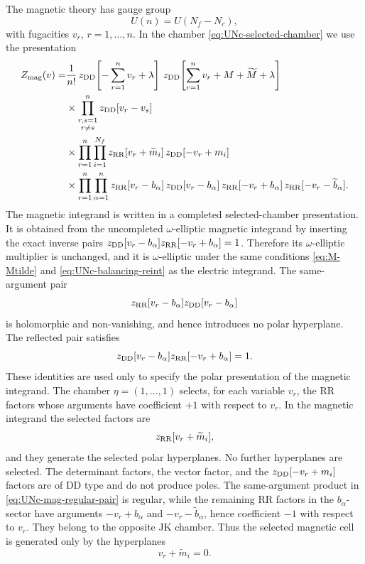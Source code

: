 \documentclass[11pt,a4paper]{article}
\numberwithin{equation}{section}
\theoremstyle{plain}
\theoremstyle{definition}
\theoremstyle{remark}
\begin{document}
The magnetic theory has gauge group
\begin{equation}
U(n)=U(N_f-N_c),
\end{equation}
with fugacities \(v_r\), \(r=1,\ldots,n\).  In the chamber \eqref{eq:UNc-selected-chamber} we use the presentation
\begin{equation}
\begin{aligned}
Z_{\rm mag}(v)
=&\frac{1}{n!}\,
z_{\rm DD}\!\left[-\sum_{r=1}^{n}v_r+\lambda\right]\,
z_{\rm DD}\!\left[\sum_{r=1}^{n}v_r+M+\widetilde M+\lambda\right]
\\
&\times
\prod_{\substack{r,s=1\\ r\neq s}}^{n}
z_{\rm DD}[v_r-v_s]
\\
&\times
\prod_{r=1}^{n}\prod_{i=1}^{N_f}
z_{\rm RR}[v_r+\widetilde m_i]\,
z_{\rm DD}[-v_r+m_i]
\\
&\times
\prod_{r=1}^{n}\prod_{\alpha=1}^{n}
z_{\rm RR}[v_r-b_\alpha]\,
z_{\rm DD}[v_r-b_\alpha]\,
z_{\rm RR}[-v_r+b_\alpha]\,
z_{\rm RR}[-v_r-\widetilde b_\alpha] .
\end{aligned}
\label{eq:Zmag-UNc-reint-completed}
\end{equation}
The magnetic integrand is written in a completed selected-chamber presentation.  It is obtained from the uncompleted \(\omega\)-elliptic magnetic integrand by inserting the exact inverse pairs \(z_{\rm DD}[v_r-b_\alpha]z_{\rm RR}[-v_r+b_\alpha]=1\).  Therefore its \(\omega\)-elliptic multiplier is unchanged, and it is \(\omega\)-elliptic under the same conditions \eqref{eq:M-Mtilde} and \eqref{eq:UNc-balancing-reint} as the electric integrand.
The same-argument pair
\begin{equation}
z_{\rm RR}[v_r-b_\alpha] z_{\rm DD}[v_r-b_\alpha]
\label{eq:UNc-mag-regular-pair}
\end{equation}
is holomorphic and non-vanishing, and hence introduces no polar hyperplane.  The reflected pair satisfies
\begin{equation}
z_{\rm DD}[v_r-b_\alpha]z_{\rm RR}[-v_r+b_\alpha]=1 .
\label{eq:UNc-reint-identity-pair}
\end{equation}
These identities are used only to specify the polar presentation of the magnetic integrand.
The chamber \(\eta=(1,\ldots,1)\) selects, for each variable \(v_r\), the RR factors whose arguments have coefficient \(+1\) with respect to \(v_r\).  In the magnetic integrand the selected factors are
\begin{equation}
z_{\rm RR}[v_r+\widetilde m_i] ,
\label{eq:UNc-mag-selected-hyperplanes}
\end{equation}
and they generate the selected polar hyperplanes.  No further hyperplanes are selected.  The determinant factors, the vector factor, and the \(z_{\rm DD}[-v_r+m_i]\) factors are of DD type and do not produce poles.  The same-argument product in \eqref{eq:UNc-mag-regular-pair} is regular, while the remaining RR factors in the \(b_\alpha\)-sector have arguments \(-v_r+b_\alpha\) and \(-v_r-\widetilde b_\alpha\), hence coefficient \(-1\) with respect to \(v_r\).  They belong to the opposite JK chamber.  Thus the selected magnetic cell is generated only by the hyperplanes
\begin{equation}
v_r+\widetilde m_i=0 .
\end{equation}
\end{document}
